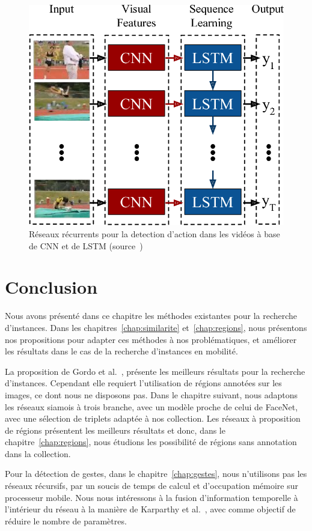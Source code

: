 \begin{figure}[ht!]
\centering
\includegraphics[width=\columnwidth]{figures/cnnlstm.png}%
\caption{Réseaux récurrents pour la detection d'action dans les vidéos à base de CNN et de LSTM (source~\cite{donahue2015long})}%
\label{fig:cnnlstm}%
\end{figure}


\section{Conclusion}

Nous avons présenté dans ce chapitre les méthodes existantes pour la recherche d’instances.
Dans les chapitres~\ref{chap:similarite} et~\ref{chap:regions}, nous présentons nos propositions pour adapter ces méthodes à nos problématiques, et améliorer les résultats dans le cas de la recherche d’instances en mobilité. 

La proposition de Gordo et al.~\cite{gordo2016deep}, présente les meilleurs résultats pour la recherche d’instances.
Cependant elle requiert l’utilisation de régions annotées sur les images, ce dont nous ne disposons pas. 
Dans le chapitre suivant, nous adaptons les réseaux siamois à trois branche, avec un modèle proche de celui de FaceNet, avec une sélection de triplets adaptée à nos collection. 
Les réseaux à proposition de régions présentent les meilleurs résultats et donc, dans le chapitre~\ref{chap:regions}, nous étudions les possibilité de régions sans annotation dans la collection.

Pour la détection de gestes, dans le chapitre~\ref{chap:gestes}, nous n’utilisons pas les réseaux récursifs, par un soucis de temps de calcul et d’occupation mémoire sur processeur mobile.
Nous nous intéressons à la fusion d’information temporelle à l’intérieur du réseau à la manière de Karparthy et al.~\cite{karpathy2014large}, avec comme objectif de réduire le nombre de paramètres.

